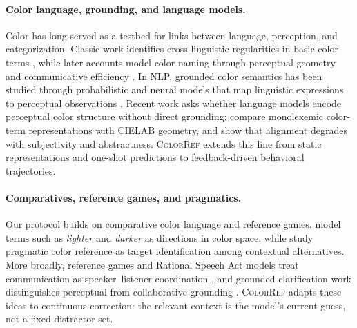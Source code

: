 \documentclass[11pt]{article}
\begin{document}
\paragraph{Color language, grounding, and language models.}
Color has long served as a testbed for links between language, perception,
and categorization. Classic work identifies cross-linguistic regularities in
basic color terms \citep{berlin1991basic}, while later accounts model color
naming through perceptual geometry and communicative efficiency
\citep{regier2007color,zaslavsky2018efficient}. In NLP, grounded color
semantics has been studied through probabilistic and neural models that map
linguistic expressions to perceptual observations
\citep{mcmahan2015bayesian,monroe2017colors}. Recent work asks whether
language models encode perceptual color structure without direct grounding:
\citet{abdou-etal-2021-language} compare monolexemic color-term
representations with CIELAB geometry, and
\citet{loyola-etal-2023-perceptual} show that alignment degrades with
subjectivity and abstractness. \textsc{ColorRef} extends this line from
static representations and one-shot predictions to feedback-driven
behavioral trajectories.

\paragraph{Comparatives, reference games, and pragmatics.}
Our protocol builds on comparative color language and reference games.
\citet{winn-muresan-2018-lighter} model terms such as \textit{lighter} and
\textit{darker} as directions in color space, while
\citet{monroe2017colors} study pragmatic color reference as target
identification among contextual alternatives. More broadly, reference games
and Rational Speech Act models treat communication as speaker--listener
coordination
\citep{lewis1969convention,frank2012predicting,goodman2016pragmatic}, and
grounded clarification work distinguishes perceptual from collaborative
grounding \citep{benotti2021recipe}. \textsc{ColorRef} adapts these ideas to
continuous correction: the relevant context is the model's current guess,
not a fixed distractor set.
\end{document}
